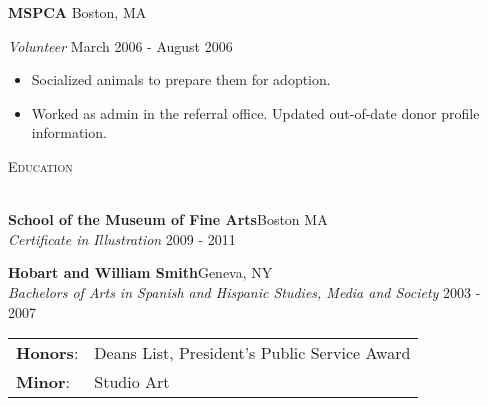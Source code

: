 \documentclass[a4paper]{article}
\newcommand{\lineunder} {
    \vspace*{-8pt} \\
    \hspace*{-18pt} \hrulefill \\
}
\newcommand{\header} [1] {
    {\hspace*{-18pt}\vspace*{6pt} \textsc{#1}}
    \vspace*{-6pt} \lineunder
    \vspace{2mm}
}
\begin{document}
\textbf{\textsc{MSPCA}} \hfill Boston, MA\\
\begin{addmargin}[1em]{0em}
\vspace{2mm}
\textit{Volunteer} \hfill March 2006 - August 2006\\
\vspace{-1mm}
\begin{itemize} \itemsep 1pt
    \item Socialized animals to prepare them for adoption.
    \item Worked as admin in the referral office. Updated out-of-date donor profile information.
\end{itemize}
\end{addmargin}
\vspace{4mm}

\pagebreak[3]

\header{\faGraduationCap \hspace{1pt} Education}

\textbf{School of the Museum of Fine Arts}\hfill Boston MA\\
\textit{Certificate in Illustration} \hfill 2009 - 2011\\
\vspace{6mm}


\textbf{Hobart and William Smith}\hfill Geneva, NY\\
\textit{Bachelors of Arts in Spanish and Hispanic Studies, Media and Society} \hfill 2003 - 2007 \\
\vspace{1mm}
\begin{addmargin}[1em]{0em}
\begin{tabular}[h]{@{}ll}
\textbf{Honors}: & Deans List, President’s Public Service Award \\
\textbf{Minor}: & Studio Art\\
\end{tabular}
\end{addmargin}

\vspace{4mm}
\end{document}
